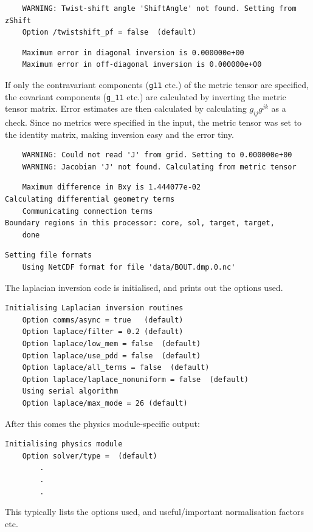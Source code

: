 \documentclass[12pt]{article}
\newcommand{\code}[1]{\texttt{#1}}
\begin{document}
%
\begin{verbatim}
	WARNING: Twist-shift angle 'ShiftAngle' not found. Setting from zShift
	Option /twistshift_pf = false  (default)
\end{verbatim}
%
\begin{verbatim}
	Maximum error in diagonal inversion is 0.000000e+00
	Maximum error in off-diagonal inversion is 0.000000e+00
\end{verbatim}
%
If only the contravariant components (\code{g11} etc.) of the metric tensor are
specified, the covariant components (\code{g\_11} etc.) are calculated by
inverting the metric tensor matrix.  Error estimates are then calculated by
calculating $g_{ij}g^{jk}$ as a check.  Since no metrics were specified in the
input, the metric tensor was set to the identity matrix, making inversion easy
and the error tiny.
%
\begin{verbatim}
	WARNING: Could not read 'J' from grid. Setting to 0.000000e+00
	WARNING: Jacobian 'J' not found. Calculating from metric tensor
\end{verbatim}
%
\begin{verbatim}
	Maximum difference in Bxy is 1.444077e-02
Calculating differential geometry terms
	Communicating connection terms
Boundary regions in this processor: core, sol, target, target,
	done
\end{verbatim}
%
\begin{verbatim}
Setting file formats
	Using NetCDF format for file 'data/BOUT.dmp.0.nc'
\end{verbatim}
%
The laplacian inversion code is initialised, and prints out the options used.
%
\begin{verbatim}
Initialising Laplacian inversion routines
	Option comms/async = true   (default)
	Option laplace/filter = 0.2 (default)
	Option laplace/low_mem = false  (default)
	Option laplace/use_pdd = false  (default)
	Option laplace/all_terms = false  (default)
	Option laplace/laplace_nonuniform = false  (default)
	Using serial algorithm
	Option laplace/max_mode = 26 (default)
\end{verbatim}
%
After this comes the physics module-specific output:
%
\begin{verbatim}
Initialising physics module
	Option solver/type =  (default)
        .
        .
        .
\end{verbatim}
%
This typically lists the options used, and useful/important normalisation
factors etc.
\end{document}
